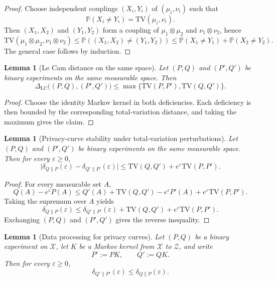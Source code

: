 \documentclass{article}
\newtheorem{lemma}[theorem]{Lemma}
\newcommand{\TV}{\mathrm{TV}}
\newcommand{\LC}{\Delta_{\mathrm{LC}}}
\newcommand{\Pbb}{\mathbb P}
\newcommand{\1}{\mathbf 1}
\begin{document}
\begin{proof}
Choose independent couplings $(X_i,Y_i)$ of $(\mu_i,\nu_i)$ such that
\[
\Pbb(X_i\neq Y_i)=\TV(\mu_i,\nu_i).
\]
Then $(X_1,X_2)$ and $(Y_1,Y_2)$ form a coupling of $\mu_1\otimes\mu_2$ and $\nu_1\otimes\nu_2$, hence
\[
\TV(\mu_1\otimes\mu_2,\nu_1\otimes\nu_2)
\le
\Pbb((X_1,X_2)\neq (Y_1,Y_2))
\le \Pbb(X_1\neq Y_1)+\Pbb(X_2\neq Y_2).
\]
The general case follows by induction.
\end{proof}

\begin{lemma}[Le Cam distance on the same space]
\label{lem:lecam-tv-bound-main}
Let $(P,Q)$ and $(P',Q')$ be binary experiments on the same measurable space. Then
\[
\LC\bigl((P,Q),(P',Q')\bigr)
\le
\max\{\TV(P,P'),\TV(Q,Q')\}.
\]
\end{lemma}

\begin{proof}
Choose the identity Markov kernel in both deficiencies. Each deficiency is then bounded by the corresponding
total-variation distance, and taking the maximum gives the claim.
\end{proof}

\begin{lemma}[Privacy-curve stability under total-variation perturbations]
\label{lem:privacy-stability-main}
Let $(P,Q)$ and $(P',Q')$ be binary experiments on the same measurable space. Then for every $\varepsilon\ge 0$,
\[
\bigl|\delta_{Q\|P}(\varepsilon)-\delta_{Q'\|P'}(\varepsilon)\bigr|
\le
\TV(Q,Q')+e^\varepsilon\TV(P,P').
\]
\end{lemma}

\begin{proof}
For every measurable set $A$,
\[
Q(A)-e^\varepsilon P(A)
\le
Q'(A)+\TV(Q,Q')-e^\varepsilon P'(A)+e^\varepsilon\TV(P,P').
\]
Taking the supremum over $A$ yields
\[
\delta_{Q\|P}(\varepsilon)
\le
\delta_{Q'\|P'}(\varepsilon)+\TV(Q,Q')+e^\varepsilon\TV(P,P').
\]
Exchanging $(P,Q)$ and $(P',Q')$ gives the reverse inequality.
\end{proof}


\begin{lemma}[Data processing for privacy curves]
\label{lem:privacy-dpi-main}
Let $(P,Q)$ be a binary experiment on $\mathcal X$, let $K$ be a Markov kernel from $\mathcal X$ to
$\mathcal Z$, and write
\[
P':=PK,
\qquad
Q':=QK.
\]
Then for every $\varepsilon\ge 0$,
\[
\delta_{Q'\|P'}(\varepsilon)\le \delta_{Q\|P}(\varepsilon).
\]
\end{lemma}
\end{document}
